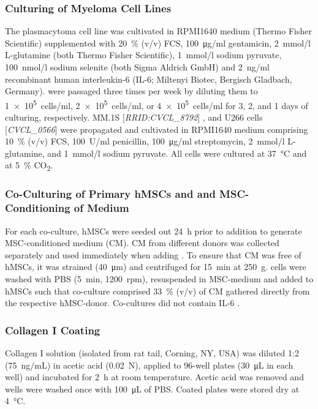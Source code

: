 \subsubsection*{Culturing of Myeloma Cell Lines}
The plasmacytoma cell line  was
cultivated in RPMI1640 medium (Thermo Fisher Scientific) supplemented with
\SI{20}{\percent} (v/v) FCS, \SI{100}{\micro\gram/ml} gentamicin, \SI{2}{mmol/l}
L-glutamine (both Thermo Fisher Scientific), \SI{1}{mmol/l} sodium pyruvate,
\SI{100}{nmol/l} sodium selenite (both Sigma Aldrich GmbH) and \SI{2}{ng/ml}
recombinant human interleukin-6 (IL-6; Miltenyi Biotec, Bergisch Gladbach,
Germany). \INA were passaged three times per week by diluting them to
\SI{1e5}{cells/ml}, \SI{2e5}{cells/ml}, or \SI{4e5}{cells/ml} for 3, 2, and 1
days of culturing, respectively. MM.1S [\textit{RRID:CVCL\_8792}]
\cite{greensteinCharacterizationMMHuman2003}, and U266 cells
    [\textit{CVCL\_0566}] \cite{nilssonEstablishedImmunoglobulinProducing1970} were
propagated and cultivated in RPMI1640 medium comprising \SI{10}{\percent} (v/v)
FCS, \SI{100}{U/ml} penicillin, \SI{100}{\micro\gram/ml} streptomycin,
\SI{2}{mmol/l} L-glutamine, and \SI{1}{mmol/l} sodium pyruvate. All cells were
cultured at \SI{37}{\degreeCelsius} and at \SI{5}{\percent} CO\textsubscript{2}.


\subsubsection*{Co-Culturing of Primary hMSCs and \INA and MSC-Conditioning of Medium}
For each co-culture, hMSCs were seeded out \SI{24}{\hour} prior to \INA
addition to generate MSC-conditioned medium (CM). CM from different donors was
collected separately and used immediately when adding \INA. To ensure that CM
was free of hMSCs, it was strained (\SI{40}{\micro\meter}) and centrifuged for
\SI{15}{\minute} at \SI{250}{g}. \INA cells were washed with PBS
(\SI{5}{\minute}, \SI{1200}{rpm}), resuspended in MSC-medium and added to hMSCs
such that co-culture comprised \SI{33}{\percent} (v/v) of CM gathered directly
from the respective hMSC-donor. Co-cultures did not contain IL-6
\cite{chatterjeePresenceBoneMarrow2002}.


\subsubsection*{Collagen I Coating}
Collagen I solution (isolated from rat tail, Corning, NY, USA) was diluted 1:2
(\SI{75}{ng/mL}) in acetic acid (\SI{0.02}{N}), applied to 96-well plates
(\SI{30}{\micro\liter} in each well) and incubated for \SI{2}{\hour} at room
temperature. Acetic acid was removed and wells were washed once with
\SI{100}{\micro\liter} of PBS. Coated plates were stored dry at
\SI{4}{\degreeCelsius}.


